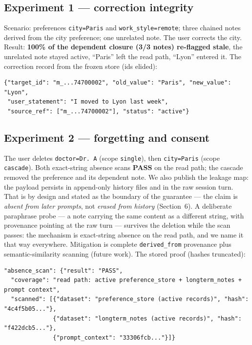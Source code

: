 \documentclass[11pt]{article}
\begin{document}
\subsection{Experiment 1 --- correction integrity}
Scenario: preferences \texttt{city=Paris} and \texttt{work\_style=remote}; three chained notes derived from the city preference; one unrelated note. The user corrects the city. Result: \textbf{100\% of the dependent closure (3/3 notes) re-flagged stale}, the unrelated note stayed active, ``Paris'' left the read path, ``Lyon'' entered it. The correction record from the frozen store (ids elided):

\begin{lstlisting}
{"target_id": "m_...74700002", "old_value": "Paris", "new_value": "Lyon",
 "user_statement": "I moved to Lyon last week",
 "source_ref": ["m_...74700002"], "status": "active"}
\end{lstlisting}

\subsection{Experiment 2 --- forgetting and consent}
The user deletes \texttt{doctor=Dr.\,A} (scope \texttt{single}), then \texttt{city=Paris} (scope \texttt{cascade}). Both exact-string absence scans \textbf{PASS} on the read path; the cascade removed the preference and its dependent note. We also publish the leakage map: the payload persists in append-only history files and in the raw session turn. That is by design and stated as the boundary of the guarantee --- the claim is \emph{absent from later prompts}, not \emph{erased from history} (Section~6). A deliberate paraphrase probe --- a note carrying the same content as a different string, with provenance pointing at the raw turn --- survives the deletion while the scan passes: the mechanism is exact-string absence on the read path, and we name it that way everywhere. Mitigation is complete \texttt{derived\_from} provenance plus semantic-similarity scanning (future work). The stored proof (hashes truncated):

\begin{lstlisting}
"absence_scan": {"result": "PASS",
  "coverage": "read path: active preference_store + longterm_notes + prompt context",
  "scanned": [{"dataset": "preference_store (active records)", "hash": "4c4f5b05..."},
              {"dataset": "longterm_notes (active records)", "hash": "f422dcb5..."},
              {"prompt_context": "33306fcb..."}]}
\end{lstlisting}
\end{document}
